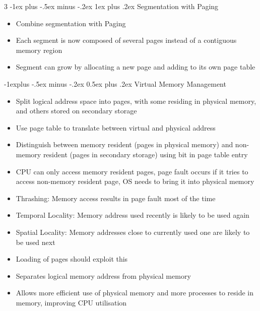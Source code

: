 \documentclass[10pt, landscape]{article}
\makeatletter
\renewcommand{\section}{\@startsection{section}{1}{0mm}%
                                {-1ex plus -.5ex minus -.2ex}%
                                {0.5ex plus .2ex}%
                                {\normalfont\large\bfseries}}
\renewcommand{\section}{\@startsection{section}{2}{0mm}%
                                {-1explus -.5ex minus -.2ex}%
                                {0.5ex plus .2ex}%
                                {\normalfont\normalsize\bfseries}}
\renewcommand{\subsection}{\@startsection{subsection}{3}{0mm}%
                                {-1ex plus -.5ex minus -.2ex}%
                                {1ex plus .2ex}%
                                {\normalfont\small\bfseries}}%
\makeatother
\begin{document}
\begin{multicols*}{3}
\subsection{Segmentation with Paging}
\begin{itemize}
    \item Combine segmentation with Paging
    \item Each segment is now composed of several pages instead of a contiguous memory region
    \item Segment can grow by allocating a new page and adding to its own page table
\end{itemize}

\section{Virtual Memory Management}
\begin{itemize}
    \item Split logical address space into pages, with some residing in physical memory, and others stored on secondary storage
    \item Use page table to translate between virtual and physical address
    \item Distinguish between memory resident (pages in physical memory) and non-memory resident (pages in secondary storage) using bit in page table entry
    \item CPU can only access memory resident pages, page fault occurs if it tries to access non-memory resident page, OS needs to bring it into physical memory
    \item Thrashing: Memory access results in page fault most of the time
    \item Temporal Locality: Memory address used recently is likely to be used again
    \item Spatial Locality: Memory addresses close to currently used one are likely to be used next
    \item Loading of pages should exploit this
    \item Separates logical memory address from physical memory
    \item Allows more efficient use of physical memory and more processes to reside in memory, improving CPU utilisation
\end{itemize}


\end{multicols*}
\end{document}
